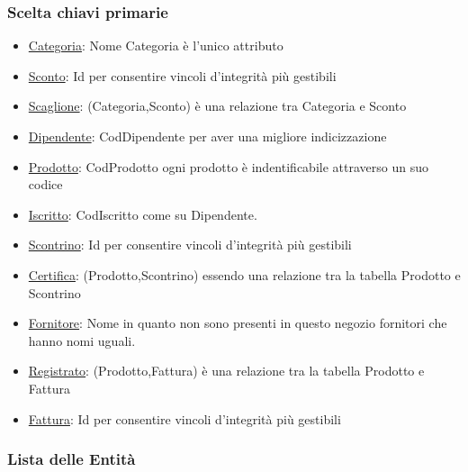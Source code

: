 \newpage
\subsubsection{Scelta chiavi primarie}
\begin{itemize}
  
\item \underline{Categoria}: Nome Categoria \`e l'unico attributo
\item \underline{Sconto}: Id per consentire vincoli d'integrit\`a pi\`u gestibili
\item \underline{Scaglione}: (Categoria,Sconto) \`e una relazione tra Categoria e Sconto
\item \underline{Dipendente}: CodDipendente per aver una migliore indicizzazione
\item \underline{Prodotto}: CodProdotto ogni prodotto \`e indentificabile attraverso un suo codice
\item \underline{Iscritto}: CodIscritto come su Dipendente.
\item \underline{Scontrino}: Id per consentire vincoli d'integrit\`a pi\`u gestibili
\item \underline{Certifica}: (Prodotto,Scontrino) essendo una relazione tra la tabella Prodotto e Scontrino
\item \underline{Fornitore}: Nome in quanto non sono presenti in questo negozio fornitori che hanno nomi uguali.
\item \underline{Registrato}: (Prodotto,Fattura) \`e una relazione tra la tabella Prodotto e Fattura
\item \underline{Fattura}: Id per consentire vincoli d'integrit\`a pi\`u gestibili

\end{itemize}

\subsubsection{Lista delle Entit\`a}

